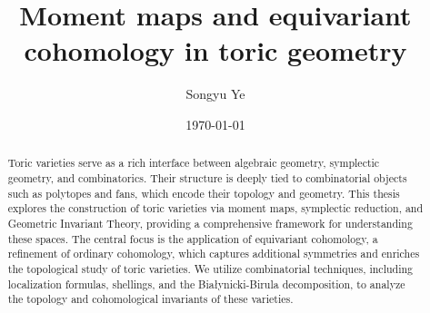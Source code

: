 \documentclass{amsart}
\numberwithin{equation}{section}
\theoremstyle{plain} %
\theoremstyle{definition}
\theoremstyle{remark}
\begin{document}
\title{Moment maps and equivariant cohomology in toric geometry}


\author{Songyu Ye} 

\address{}






\date{\today}

\begin{abstract}
    Toric varieties serve as a rich interface between algebraic geometry, symplectic geometry, and combinatorics. Their structure is deeply tied to combinatorial objects such as polytopes and fans, which encode their topology and geometry. This thesis explores the construction of toric varieties via moment maps, symplectic reduction, and Geometric Invariant Theory, providing a comprehensive framework for understanding these spaces. The central focus is the application of equivariant cohomology, a refinement of ordinary cohomology, which captures additional symmetries and enriches the topological study of toric varieties. We utilize combinatorial techniques, including localization formulas, shellings, and the Białynicki-Birula decomposition, to analyze the topology and cohomological invariants of these varieties. 
\end{abstract}


\maketitle
\tableofcontents


\end{document}
